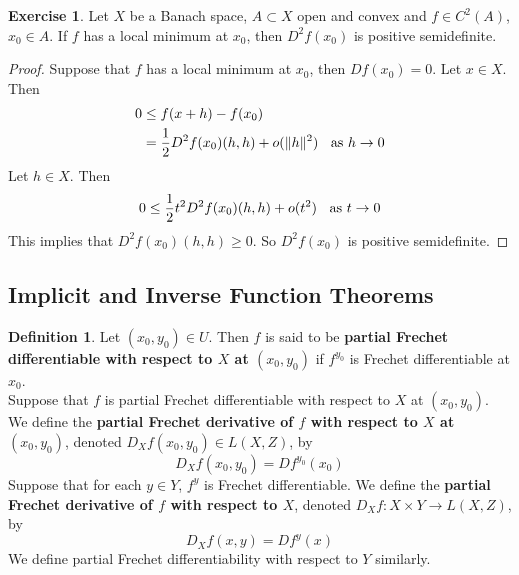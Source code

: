 \documentclass[12pt]{amsart}
\theoremstyle{definition}
\newtheorem{defn}[definition]{Definition}
\newtheorem{ex}[definition]{Exercise}
\newcommand{\tbf}[1]{\textbf{#1}}
\DeclareMathOperator*{\0}{\mbf{0}}
\DeclareMathOperator*{\1}{\mbf{1}}
\newcommand{\lex}[1]{\label{ex:#1}}
\begin{document}
	
	
	
	\begin{ex} \lex{}
	Let $X$ be a Banach space, $A \subset X$ open and convex and $f\in C^{2}(A)$, $x_0 \in A$. If $f$ has a local minimum at $x_0$, then $D^2f(x_0)$ is positive semidefinite.   
	\end{ex}
	
	\begin{proof}
	Suppose that $f$ has a local minimum at $x_0$, then $Df(x_0) = 0$. Let $x \in X$. Then 
	\begin{align*}
	0 
	& \leq f(x+h) - f(x_0) \\
	&= \frac{1}{2} D^2f(x_0)(h,h) +o(\|h\|^2) \hspace{.2cm} \text{ as } h \rightarrow 0
	\end{align*}
	Let $h \in X$. Then $$0 \leq \frac{1}{2} t^2 D^2f(x_0)(h,h) +o(t^2) \hspace{.2cm} \text{ as } t \rightarrow 0$$
	This implies that $D^2f(x_0)(h,h) \geq 0$. So $D^2f(x_0)$ is positive semidefinite.
	\end{proof}





























	\newpage
	\subsection{Implicit and Inverse Function Theorems}
	\begin{defn}
		Let $(x_0,y_0) \in U$. Then $f$ is said to be \tbf{partial Frechet differentiable with respect to $X$ at $(x_0, y_0)$} if $f^{y_0}$ is Frechet differentiable at $x_0$. \\
		Suppose that $f$ is partial Frechet differentiable with respect to $X$ at $(x_0, y_0)$. We define the \tbf{partial Frechet derivative of $f$ with respect to $X$ at $(x_0, y_0)$}, denoted $D_X f(x_0, y_0) \in L(X, Z)$, by 
		$$D_Xf(x_0, y_0) = Df^{y_0}(x_0)$$
		Suppose that for each $y \in Y$, $f^{y}$ is Frechet differentiable. We define the \tbf{partial Frechet derivative of $f$ with respect to $X$}, denoted $D_X f: X \times Y \rightarrow L(X, Z)$, by 
		$$D_Xf(x, y) = Df^{y}(x)$$
		We define partial Frechet differentiability with respect to $Y$ similarly.
	\end{defn}
\end{document}
